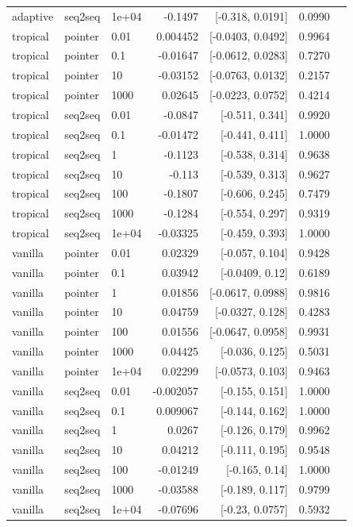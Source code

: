 \documentclass[10pt]{article}
\begin{document}
{\begin{longtable}{lllrrrl}
adaptive & seq2seq & 1e+04 & -0.1497 & [-0.318, 0.0191] & 0.0990 & \\
tropical & pointer & 0.01 & 0.004452 & [-0.0403, 0.0492] & 0.9964 & \\
tropical & pointer & 0.1 & -0.01647 & [-0.0612, 0.0283] & 0.7270 & \\
tropical & pointer & 10 & -0.03152 & [-0.0763, 0.0132] & 0.2157 & \\
tropical & pointer & 1000 & 0.02645 & [-0.0223, 0.0752] & 0.4214 & \\
tropical & seq2seq & 0.01 & -0.0847 & [-0.511, 0.341] & 0.9920 & \\
tropical & seq2seq & 0.1 & -0.01472 & [-0.441, 0.411] & 1.0000 & \\
tropical & seq2seq & 1 & -0.1123 & [-0.538, 0.314] & 0.9638 & \\
tropical & seq2seq & 10 & -0.113 & [-0.539, 0.313] & 0.9627 & \\
tropical & seq2seq & 100 & -0.1807 & [-0.606, 0.245] & 0.7479 & \\
tropical & seq2seq & 1000 & -0.1284 & [-0.554, 0.297] & 0.9319 & \\
tropical & seq2seq & 1e+04 & -0.03325 & [-0.459, 0.393] & 1.0000 & \\
vanilla & pointer & 0.01 & 0.02329 & [-0.057, 0.104] & 0.9428 & \\
vanilla & pointer & 0.1 & 0.03942 & [-0.0409, 0.12] & 0.6189 & \\
vanilla & pointer & 1 & 0.01856 & [-0.0617, 0.0988] & 0.9816 & \\
vanilla & pointer & 10 & 0.04759 & [-0.0327, 0.128] & 0.4283 & \\
vanilla & pointer & 100 & 0.01556 & [-0.0647, 0.0958] & 0.9931 & \\
vanilla & pointer & 1000 & 0.04425 & [-0.036, 0.125] & 0.5031 & \\
vanilla & pointer & 1e+04 & 0.02299 & [-0.0573, 0.103] & 0.9463 & \\
vanilla & seq2seq & 0.01 & -0.002057 & [-0.155, 0.151] & 1.0000 & \\
vanilla & seq2seq & 0.1 & 0.009067 & [-0.144, 0.162] & 1.0000 & \\
vanilla & seq2seq & 1 & 0.0267 & [-0.126, 0.179] & 0.9962 & \\
vanilla & seq2seq & 10 & 0.04212 & [-0.111, 0.195] & 0.9548 & \\
vanilla & seq2seq & 100 & -0.01249 & [-0.165, 0.14] & 1.0000 & \\
vanilla & seq2seq & 1000 & -0.03588 & [-0.189, 0.117] & 0.9799 & \\
vanilla & seq2seq & 1e+04 & -0.07696 & [-0.23, 0.0757] & 0.5932 & \\
\bottomrule
\end{longtable}
}
\end{document}
